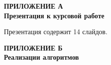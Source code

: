 \begin{center}
    \textbf{ПРИЛОЖЕНИЕ А\\Презентация к курсовой работе}
\end{center}
Презентация содержит 14 слайдов.
\clearpage
\begin{center}
    \textbf{ПРИЛОЖЕНИЕ Б\\Реализации алгоритмов}
\end{center}
